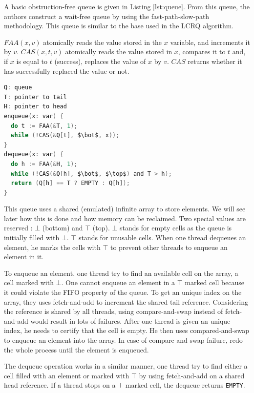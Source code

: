 A basic obstruction-free queue is given in Listing \ref{lst:queue}. From this
queue, the authors construct a wait-free queue by using the fast-path-slow-path
methodology. This queue is similar to the base used in the LCRQ algorithm.

$FAA(x, v)$ atomically reads the value stored in the $x$ variable, and
increments it by $v$. $CAS(x, t, v)$ atomically reads the value stored in $x$,
compares it to $t$ and, if $x$ is equal to $t$ (success), replaces the value of
$x$ by $v$. $CAS$ returns whether it has successfully replaced the value or not.

\begin{lstlisting}[mathescape,
                   frame=single,
                   caption={An obstruction-free queue using an infinite array.},
                   label={lst:queue},
                   language=C]
Q: queue
T: pointer to tail
H: pointer to head
enqueue(x: var) {
  do t := FAA(&T, 1);
  while (!CAS(&Q[t], $\bot$, x));
}
dequeue(x: var) {
  do h := FAA(&H, 1);
  while (!CAS(&Q[h], $\bot$, $\top$) and T > h);
  return (Q[h] == T ? EMPTY : Q[h]);
}
\end{lstlisting}

 This queue uses a shared (emulated) infinite array to
store elements. We will see later how this is done and how memory can be
reclaimed. Two special values are reserved : $\bot$ (bottom) and $\top$ (top).
$\bot$ stands for empty cells as the queue is initially filled with $\bot$.
$\top$ stands for unusable cells. When one thread dequeues an element, he marks
the cells with $\top$ to prevent other threads to enqueue an element in it.

To enqueue an element, one thread try to find an available cell on the array, a
cell marked with $\bot$. One cannot enqueue an element in a $\top$ marked cell
because it could violate the FIFO property of the queue. To get an unique index
on the array, they uses fetch-and-add to increment the shared tail reference.
Considering the reference is shared by all threads, using compare-and-swap instead
of fetch-and-add would result in lots of failures. After one thread is given an
unique index, he needs to certify that the cell is empty. He then uses
compared-and-swap to enqueue an element into the array. In case of
compare-and-swap failure, redo the whole process until the element is enqueued.

The dequeue operation works in a similar manner, one thread try to find either a
cell filled with an element or marked with $\top$ by using fetch-and-add on a
shared head reference. If a thread stops on a $\top$ marked cell, the dequeue
returns \texttt{EMPTY}.

